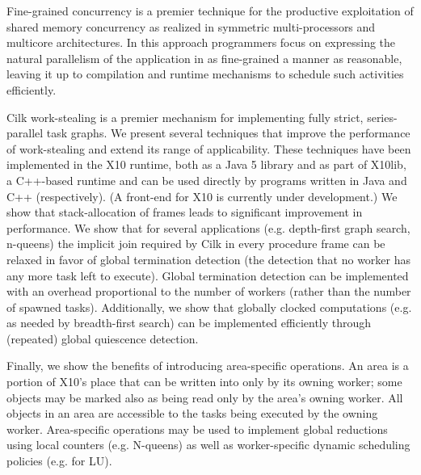 Fine-grained concurrency is a premier technique for the productive exploitation
of shared memory concurrency as realized in symmetric multi-processors and
multicore architectures. In this approach programmers focus on expressing the
natural parallelism of the application in as fine-grained
a manner as reasonable, leaving it  up to compilation and runtime mechanisms to
schedule such activities efficiently.

Cilk work-stealing is a premier mechanism for implementing fully strict,
series-parallel  task graphs. We present several techniques that improve the
performance of work-stealing and extend its range of applicability.
These techniques have been implemented in the X10 runtime, both
as a Java 5 library and as part of X10lib, a C++-based runtime and can be used
directly by programs written in Java and C++ (respectively). (A front-end for
X10 is currently under development.) We show that stack-allocation of frames
leads to significant improvement in performance. We show that for several
applications (e.g. depth-first graph search, n-queens) the implicit join
required  by Cilk in every procedure frame can be relaxed in favor of global
termination detection (the detection that no worker has any more task left to
execute). Global termination detection can be  implemented with an overhead
proportional to the number of workers (rather than the number of spawned
tasks). Additionally, we show that globally clocked computations (e.g. as
needed by breadth-first search) can be implemented efficiently through
(repeated) global quiescence detection.

Finally, we show the benefits of introducing  area-specific  operations. An
area is a portion  of X10's place that can be written into only by its owning
worker; some objects may be marked also as being read only by the area's owning
worker. All objects in an area are accessible to the tasks being executed by
the owning worker. Area-specific operations may be used to implement global
reductions using local counters (e.g. N-queens) as well as worker-specific
dynamic scheduling policies (e.g. for LU).
